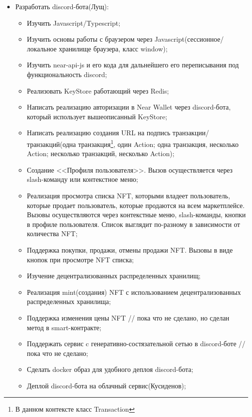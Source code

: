 \begin{itemize}
\begin{itemize}
    \end{itemize}
    \item Разработать discord-бота(Лущ):
    \begin{itemize}
        \item Изучить Javascript/Typescript;
        \item Изучить основы работы с браузером через Javascript(сессионное/локальное хранилище браузера, класс window);
        \item Изучить near-api-js и его кода для дальнейшего его переписывания под функциональность discord;
        \item Реализовать KeyStore\cite{nearclasskeystore} работающий через Redis\cite{redis};
        \item Написать реализацию авторизации в Near Wallet\cite{nearwallet} через discord-бота, который использует вышеописанный KeyStore;
        \item Написать реализацию создания URL на подпись транзакции/транзакций(одна транзакция\footnote{В данном контексте класс Transaction\cite{nearclasstransaction}}, один Action\cite{nearclassaction}; одна транзакция, несколько Action; несколько транзакций, несколько Action);
        \item Создание <<Профиля пользователя>>. Вызов осуществляется через slash-команду\cite{discordjsslashcommands} или контекстное меню;
        \item Реализация просмотра списка NFT, которыми владеет пользователь, которые продает пользователь, которые продаются на всем маркетплейсе. Вызовы осуществляются через контекстные меню, slash-команды, кнопки в профиле пользователя. Список выглядит по-разному в зависимости от количества NFT;
        \item Поддержка покупки, продажи, отмены продажи NFT. Вызовы в виде кнопок при просмотре NFT списка;
        \item Изучение децентрализованных распределенных хранилищ;
        \item Реализация mint(создания) NFT с использованием децентрализованных распределенных хранилища;
        \item Поддержка изменения цены NFT // пока что не сделано, но сделан метод в smart-контракте;
        \item Поддержать сервис c генеративно-состязательной сетью в discord-боте // пока что не сделано;
        \item Сделать docker образ для удобного деплоя discord-бота;
        \item Деплой discord-бота на облачный сервис(Кусиденов);

\end{itemize}
\end{itemize}
